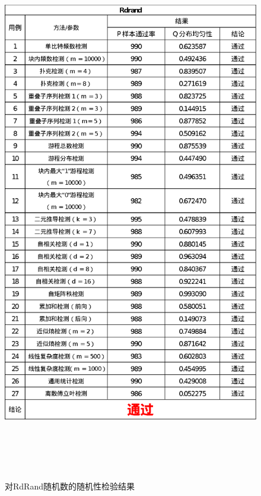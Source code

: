 \documentclass[12pt,a4paper]{article}%
\begin{document}
    \begin{figure}
        \centering
        \includegraphics[height=23.7cm]{Rdrand}
        \caption{对RdRand随机数的随机性检验结果}
        \label{fig:fig.1}
        \hypertarget{fig:fig.1}{}

    \end{figure}
\end{document}
